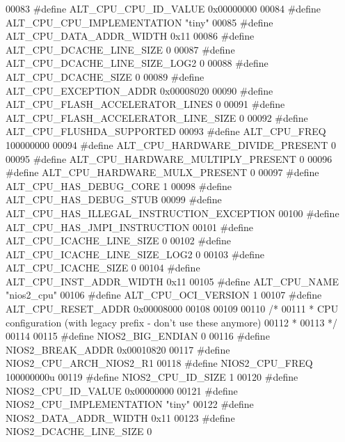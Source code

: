 \begin{DoxyCode}
00083 \textcolor{preprocessor}{#define ALT\_CPU\_CPU\_ID\_VALUE 0x00000000}
00084 \textcolor{preprocessor}{#define ALT\_CPU\_CPU\_IMPLEMENTATION "tiny"}
00085 \textcolor{preprocessor}{#define ALT\_CPU\_DATA\_ADDR\_WIDTH 0x11}
00086 \textcolor{preprocessor}{#define ALT\_CPU\_DCACHE\_LINE\_SIZE 0}
00087 \textcolor{preprocessor}{#define ALT\_CPU\_DCACHE\_LINE\_SIZE\_LOG2 0}
00088 \textcolor{preprocessor}{#define ALT\_CPU\_DCACHE\_SIZE 0}
00089 \textcolor{preprocessor}{#define ALT\_CPU\_EXCEPTION\_ADDR 0x00008020}
00090 \textcolor{preprocessor}{#define ALT\_CPU\_FLASH\_ACCELERATOR\_LINES 0}
00091 \textcolor{preprocessor}{#define ALT\_CPU\_FLASH\_ACCELERATOR\_LINE\_SIZE 0}
00092 \textcolor{preprocessor}{#define ALT\_CPU\_FLUSHDA\_SUPPORTED}
00093 \textcolor{preprocessor}{#define ALT\_CPU\_FREQ 100000000}
00094 \textcolor{preprocessor}{#define ALT\_CPU\_HARDWARE\_DIVIDE\_PRESENT 0}
00095 \textcolor{preprocessor}{#define ALT\_CPU\_HARDWARE\_MULTIPLY\_PRESENT 0}
00096 \textcolor{preprocessor}{#define ALT\_CPU\_HARDWARE\_MULX\_PRESENT 0}
00097 \textcolor{preprocessor}{#define ALT\_CPU\_HAS\_DEBUG\_CORE 1}
00098 \textcolor{preprocessor}{#define ALT\_CPU\_HAS\_DEBUG\_STUB}
00099 \textcolor{preprocessor}{#define ALT\_CPU\_HAS\_ILLEGAL\_INSTRUCTION\_EXCEPTION}
00100 \textcolor{preprocessor}{#define ALT\_CPU\_HAS\_JMPI\_INSTRUCTION}
00101 \textcolor{preprocessor}{#define ALT\_CPU\_ICACHE\_LINE\_SIZE 0}
00102 \textcolor{preprocessor}{#define ALT\_CPU\_ICACHE\_LINE\_SIZE\_LOG2 0}
00103 \textcolor{preprocessor}{#define ALT\_CPU\_ICACHE\_SIZE 0}
00104 \textcolor{preprocessor}{#define ALT\_CPU\_INST\_ADDR\_WIDTH 0x11}
00105 \textcolor{preprocessor}{#define ALT\_CPU\_NAME "nios2\_cpu"}
00106 \textcolor{preprocessor}{#define ALT\_CPU\_OCI\_VERSION 1}
00107 \textcolor{preprocessor}{#define ALT\_CPU\_RESET\_ADDR 0x00008000}
00108 
00109 
00110 \textcolor{comment}{/*}
00111 \textcolor{comment}{ * CPU configuration (with legacy prefix - don't use these anymore)}
00112 \textcolor{comment}{ *}
00113 \textcolor{comment}{ */}
00114 
00115 \textcolor{preprocessor}{#define NIOS2\_BIG\_ENDIAN 0}
00116 \textcolor{preprocessor}{#define NIOS2\_BREAK\_ADDR 0x00010820}
00117 \textcolor{preprocessor}{#define NIOS2\_CPU\_ARCH\_NIOS2\_R1}
00118 \textcolor{preprocessor}{#define NIOS2\_CPU\_FREQ 100000000u}
00119 \textcolor{preprocessor}{#define NIOS2\_CPU\_ID\_SIZE 1}
00120 \textcolor{preprocessor}{#define NIOS2\_CPU\_ID\_VALUE 0x00000000}
00121 \textcolor{preprocessor}{#define NIOS2\_CPU\_IMPLEMENTATION "tiny"}
00122 \textcolor{preprocessor}{#define NIOS2\_DATA\_ADDR\_WIDTH 0x11}
00123 \textcolor{preprocessor}{#define NIOS2\_DCACHE\_LINE\_SIZE 0}

\end{DoxyCode}
